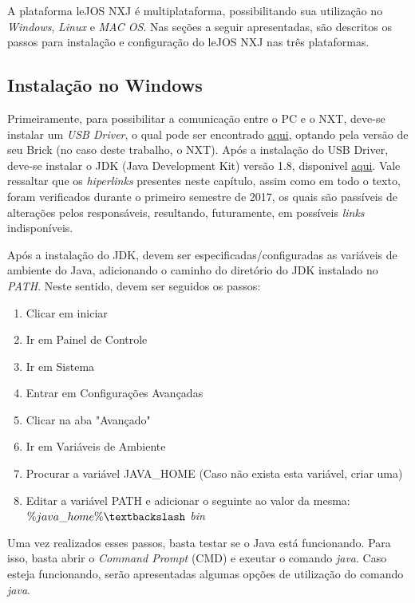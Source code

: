 A plataforma leJOS NXJ é multiplataforma, possibilitando sua utilização no \textit{Windows}, \textit{Linux} e \textit{MAC OS}. Nas seções a seguir apresentadas, são descritos os passos para instalação e configuração do leJOS NXJ nas três plataformas.

\subsection{Instalação no Windows} %
\label{sub:instalação_no_windows}

	Primeiramente, para possibilitar a comunicação entre o PC e o NXT, deve-se instalar um \textit{USB Driver}, o qual pode ser encontrado \href{https://www.lego.com/en-us/mindstorms/downloads}{aqui}, optando pela versão de seu Brick (no caso deste trabalho, o NXT). Após a instalação do USB Driver, deve-se instalar o JDK (Java Development Kit) versão 1.8, disponivel \href{http://www.oracle.com/technetwork/java/}{aqui}.
	Vale ressaltar que os \textit{hiperlinks} presentes neste capítulo, assim como em todo o texto, foram verificados durante o primeiro semestre de 2017, os quais
	são passíveis de alterações pelos responsáveis, resultando, futuramente, em possíveis \textit{links} indisponíveis.

	Após a instalação do JDK, devem ser especificadas/configuradas as variáveis de ambiente do Java, adicionando o caminho do diretório do JDK instalado no \textit{PATH}.
	Neste sentido, devem ser seguidos os passos:

	\begin{enumerate}
		\item Clicar em iniciar
		\item Ir em Painel de Controle
		\item Ir em Sistema
		\item Entrar em Configurações Avançadas
		\item Clicar na aba "Avançado"
		\item Ir em Variáveis de Ambiente
		\item Procurar a variável JAVA\_HOME (Caso não exista esta variável, criar uma)
		\item Editar a variável PATH e adicionar o seguinte ao valor da mesma: \textit{$\%java\_home\% \textbackslash$ bin}
	\end{enumerate}

	Uma vez realizados esses passos, basta testar se o Java está funcionando. Para isso, basta abrir o \textit{Command Prompt} (CMD) e exeutar o comando \textit{java}. Caso esteja funcionando, serão apresentadas algumas opções de utilização do comando \textit{java}.

